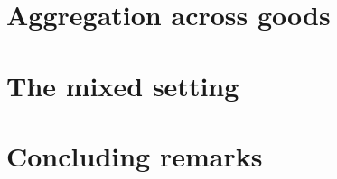 \documentclass[english, a4paper,12pt]{article}
\begin{document}
 

\section{Aggregation across goods} \label{sec:onegood}

\section{The mixed setting} \label{sec:mixedagg}


\section{Concluding remarks} \label{sec:conclusion}




\end{document}
